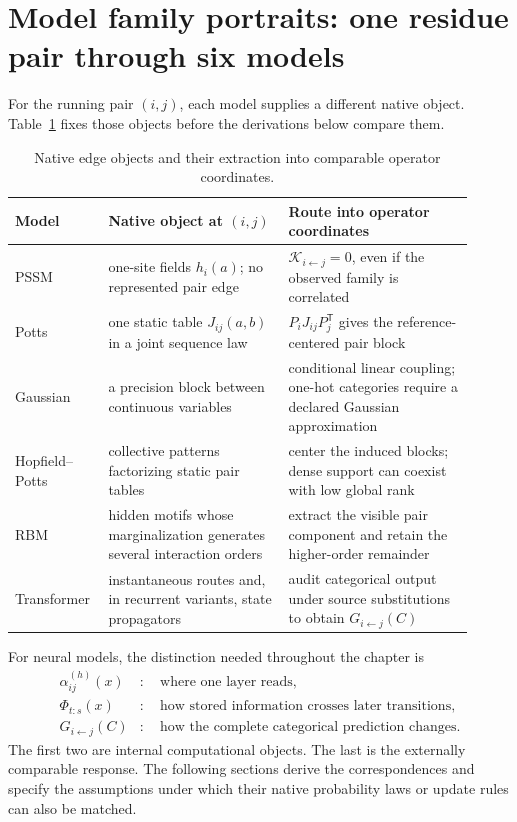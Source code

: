 \section{Model family portraits: one residue pair through six models}

For the running pair $(i,j)$, each model supplies a different native object.
Table~\ref{tab:book-native-edge-objects} fixes those objects before the derivations below compare them.

\begin{table}[tbp]
\centering
\small
\begin{tabular}{@{}>{\raggedright\arraybackslash}p{0.16\linewidth}
                >{\raggedright\arraybackslash}p{0.37\linewidth}
                >{\raggedright\arraybackslash}p{0.38\linewidth}@{}}
\toprule
Model & Native object at $(i,j)$ & Route into operator coordinates \\
\midrule
PSSM & one-site fields $h_i(a)$; no represented pair edge &
$\mathcal K_{i\leftarrow j}=0$, even if the observed family is correlated \\
Potts & one static table $J_{ij}(a,b)$ in a joint sequence law &
$P_iJ_{ij}P_j^{\mathsf T}$ gives the reference-centered pair block \\
Gaussian & a precision block between continuous variables &
conditional linear coupling; one-hot categories require a declared Gaussian approximation \\
Hopfield--Potts & collective patterns factorizing static pair tables &
center the induced blocks; dense support can coexist with low global rank \\
RBM & hidden motifs whose marginalization generates several interaction orders &
extract the visible pair component and retain the higher-order remainder \\
Transformer & instantaneous routes and, in recurrent variants, state propagators &
audit categorical output under source substitutions to obtain
$G_{i\leftarrow j}(C)$ \\
\bottomrule
\end{tabular}
\caption{Native edge objects and their extraction into comparable operator coordinates.}
\label{tab:book-native-edge-objects}
\end{table}

For neural models, the distinction needed throughout the chapter is
\begin{equation}
\begin{aligned}
\alpha_{ij}^{(h)}(x)&:\quad \text{where one layer reads},\\
\Phi_{t:s}(x)&:\quad \text{how stored information crosses later transitions},\\
G_{i\leftarrow j}(C)&:\quad \text{how the complete categorical prediction changes}.
\end{aligned}
\end{equation}
The first two are internal computational objects.  The last is the externally comparable
response.  The following sections derive the correspondences and specify the assumptions under
which their native probability laws or update rules can also be matched.
